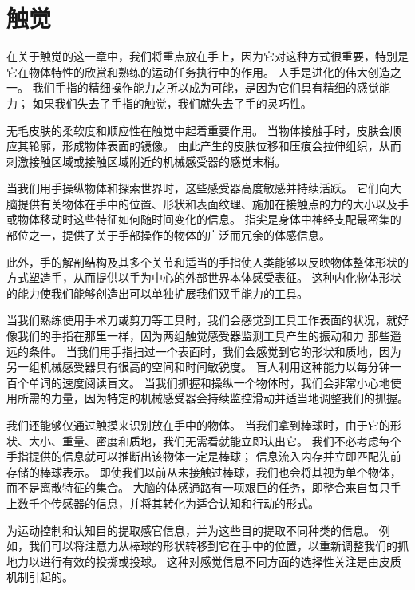 \chapter{触觉} \label{chap:chap19}
在关于触觉的这一章中，我们将重点放在手上，因为它对这种方式很重要，特别是它在物体特性的欣赏和熟练的运动任务执行中的作用。 人手是进化的伟大创造之一。 我们手指的精细操作能力之所以成为可能，是因为它们具有精细的感觉能力； 如果我们失去了手指的触觉，我们就失去了手的灵巧性。

无毛皮肤的柔软度和顺应性在触觉中起着重要作用。 当物体接触手时，皮肤会顺应其轮廓，形成物体表面的镜像。 由此产生的皮肤位移和压痕会拉伸组织，从而刺激接触区域或接触区域附近的机械感受器的感觉末梢。

当我们用手操纵物体和探索世界时，这些感受器高度敏感并持续活跃。 它们向大脑提供有关物体在手中的位置、形状和表面纹理、施加在接触点的力的大小以及手或物体移动时这些特征如何随时间变化的信息。 指尖是身体中神经支配最密集的部位之一，提供了关于手部操作的物体的广泛而冗余的体感信息。

此外，手的解剖结构及其多个关节和适当的手指使人类能够以反映物体整体形状的方式塑造手，从而提供以手为中心的外部世界本体感受表征。 这种内化物体形状的能力使我们能够创造出可以单独扩展我们双手能力的工具。

当我们熟练使用手术刀或剪刀等工具时，我们会感觉到工具工作表面的状况，就好像我们的手指在那里一样，因为两组触觉感受器监测工具产生的振动和力 那些遥远的条件。 当我们用手指扫过一个表面时，我们会感觉到它的形状和质地，因为另一组机械感受器具有很高的空间和时间敏锐度。 盲人利用这种能力以每分钟一百个单词的速度阅读盲文。 当我们抓握和操纵一个物体时，我们会非常小心地使用所需的力量，因为特定的机械感受器会持续监控滑动并适当地调整我们的抓握。

我们还能够仅通过触摸来识别放在手中的物体。 当我们拿到棒球时，由于它的形状、大小、重量、密度和质地，我们无需看就能立即认出它。 我们不必考虑每个手指提供的信息就可以推断出该物体一定是棒球； 信息流入内存并立即匹配先前存储的棒球表示。 即使我们以前从未接触过棒球，我们也会将其视为单个物体，而不是离散特征的集合。 大脑的体感通路有一项艰巨的任务，即整合来自每只手上数千个传感器的信息，并将其转化为适合认知和行动的形式。

为运动控制和认知目的提取感官信息，并为这些目的提取不同种类的信息。 例如，我们可以将注意力从棒球的形状转移到它在手中的位置，以重新调整我们的抓地力以进行有效的投掷或投球。 这种对感觉信息不同方面的选择性关注是由皮质机制引起的。

